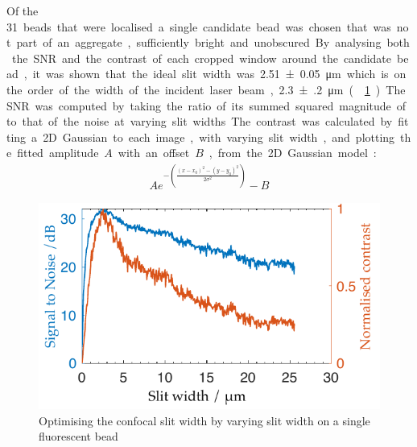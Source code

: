 Of the \SI{31} beads that were localised a single candidate bead was chosen that
was not part of an aggregate,
sufficiently bright and unobscured.
By analysing both the \gls{SNR} and the contrast of each cropped window around the candidate bead, it was shown that the ideal slit width was \SI{2.51(5)}{\micro\metre} which is on the order of the width of the incident laser beam, \SI{2.3(2)}{\micro\metre} (\figurename~\ref{fig:optimal_slit_snr_contrast}).
The \gls{SNR} was computed by taking the ratio of its summed squared magnitude of to that of the noise at varying slit widths.
The contrast was calculated by fitting a \gls{2D} Gaussian to each image, with varying slit width, and plotting the fitted amplitude \(A\) with an offset \(B\), from the \gls{2D} Gaussian model:
\begin{align}
  A e^{-\left(\frac{(x-x_0)^2-(y-y_0)^2}{2\sigma^2}\right)}-B
\end{align}
\begin{figure}
  \centering
  \includegraphics{Chapters/dualslit/Figs/PDF/optimal_slit_snr_contrast}
  \caption{Optimising the confocal slit width by varying slit width on a single fluorescent bead}
  \label{fig:optimal_slit_snr_contrast}
\end{figure}
